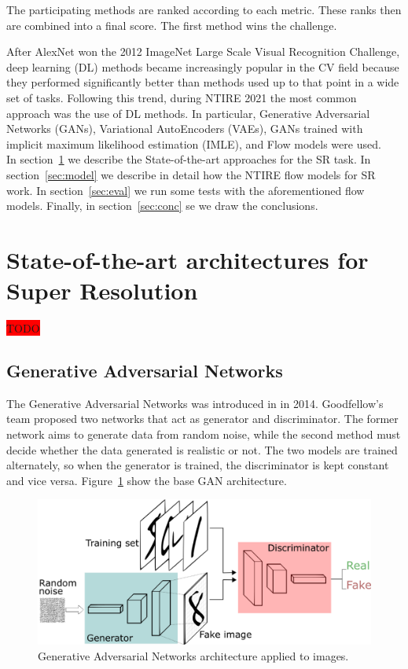 \documentclass{article}
\begin{document}
\noindent The participating methods are ranked according to each metric. These ranks then are combined into a final score. The first method wins the challenge.

After AlexNet won the 2012 ImageNet Large Scale Visual Recognition Challenge, deep learning (DL) methods became increasingly popular in the CV field because they performed significantly better than methods used up to that point in a wide set of tasks. Following this trend, during NTIRE 2021 the most common approach was the use of DL methods. In particular, Generative Adversarial Networks (GANs), Variational AutoEncoders (VAEs), GANs trained with implicit maximum likelihood estimation (IMLE), and Flow models were used. \\ %


In section~\ref{sec:sota} we describe the State-of-the-art approaches for the SR task. In section~\ref{sec:model} we describe in detail how the NTIRE flow models for SR work. In section~\ref{sec:eval} we run some tests with the aforementioned flow models. Finally, in section~\ref{sec:conc} se we draw the conclusions.

\newpage
\section{State-of-the-art architectures for Super Resolution}\label{sec:sota}
\colorbox{red}{TODO} \\

\subsection{Generative Adversarial Networks}
The Generative Adversarial Networks was introduced in \cite{gans} in 2014. Goodfellow's team proposed two networks that act as generator and discriminator. The former network aims to generate data from random noise, while the second method must decide whether the data generated is realistic or not. The two models are trained alternately, so when the generator is trained, the discriminator is kept constant and vice versa. Figure~\ref{img:gan} show the base GAN architecture.
\begin{figure}[h]
    \centering
    \includegraphics[scale=.3]{gan.png}
    \caption{Generative Adversarial Networks architecture applied to images.}
    \label{img:gan}
\end{figure}
\end{document}
